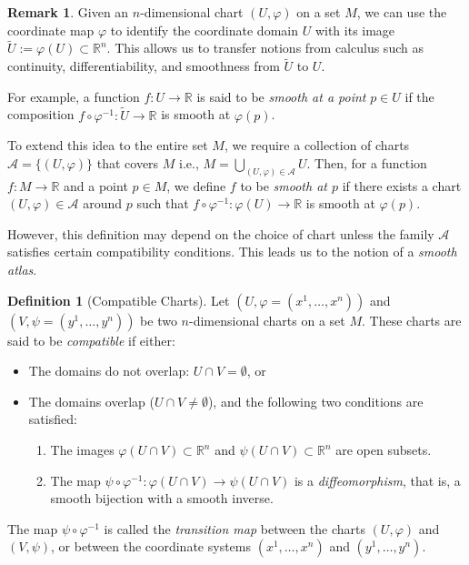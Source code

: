 \documentclass[12pt]{article}
\theoremstyle{definition}
\newtheorem{definition}{Definition}[section]
\newtheorem{remark}{Remark}[section]
\begin{document}
\medskip
\begin{remark}
Given an $n$-dimensional chart $(U, \varphi)$ on a set $M$, we can use the coordinate map $\varphi$ to identify the coordinate domain $U$ with its image $\tilde{U} := \varphi(U) \subset \mathbb{R}^n$. This allows us to transfer notions from calculus such as continuity, differentiability, and smoothness from $\tilde{U}$ to $U$.

For example, a function $f : U \to \mathbb{R}$ is said to be \emph{smooth at a point} $p \in U$ if the composition $f \circ \varphi^{-1} : \tilde{U} \to \mathbb{R}$ is smooth at $\varphi(p)$.

To extend this idea to the entire set $M$, we require a collection of charts $\mathcal{A} = \{(U, \varphi)\}$ that covers $M$ i.e., $M = \bigcup_{(U, \varphi) \in \mathcal{A}} U$. Then, for a function $f : M \to \mathbb{R}$ and a point $p \in M$, we define $f$ to be \emph{smooth at $p$} if there exists a chart $(U, \varphi) \in \mathcal{A}$ around $p$ such that $f \circ \varphi^{-1} : \varphi(U) \to \mathbb{R}$ is smooth at $\varphi(p)$.

However, this definition may depend on the choice of chart unless the family $\mathcal{A}$ satisfies certain compatibility conditions. This leads us to the notion of a \emph{smooth atlas}.
\end{remark}

\medskip
\begin{definition}[Compatible Charts]
Let $(U, \varphi = (x^1, \ldots, x^n))$ and $(V, \psi = (y^1, \ldots, y^n))$ be two $n$-dimensional charts on a set $M$. These charts are said to be \emph{compatible} if either:

\begin{itemize}
    \item The domains do not overlap: $U \cap V = \emptyset$, or
    \item The domains overlap ($U \cap V \neq \emptyset$), and the following two conditions are satisfied:
    \begin{enumerate}
        \item The images $\varphi(U \cap V) \subset \mathbb{R}^n$ and $\psi(U \cap V) \subset \mathbb{R}^n$ are open subsets.
        \item The map $\psi \circ \varphi^{-1} : \varphi(U \cap V) \to \psi(U \cap V)$ is a \emph{diffeomorphism}, that is, a smooth bijection with a smooth inverse.
    \end{enumerate}
\end{itemize}

The map $\psi \circ \varphi^{-1}$ is called the \emph{transition map} between the charts $(U, \varphi)$ and $(V, \psi)$, or between the coordinate systems $(x^1, \ldots, x^n)$ and $(y^1, \ldots, y^n)$.
\end{definition}
\end{document}
